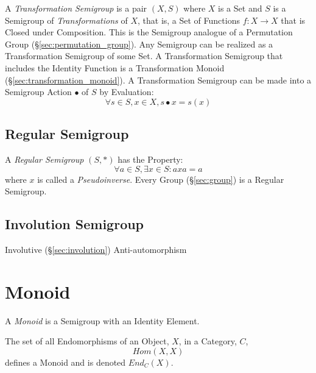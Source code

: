 A \emph{Transformation Semigroup} is a pair $(X,S)$ where $X$ is a Set
and $S$ is a Semigroup of \emph{Transformations} of $X$, that is, a
Set of Functions $f : X \rightarrow X$ that is Closed under
Composition. This is the Semigroup analogue of a Permutation Group
(\S\ref{sec:permutation_group}). Any Semigroup can be realized as a
Transformation Semigroup of some Set. A Transformation Semigroup that
includes the Identity Function is a Transformation Monoid
(\S\ref{sec:transformation_monoid}). A Transformation Semigroup can be
made into a Semigroup Action $\bullet$ of $S$ by Evaluation:
\[
  \forall s \in S, x \in X, s \bullet x = s(x)
\]



\subsection{Regular Semigroup}\label{sec:regular_semigroup}

A \emph{Regular Semigroup} $(S,*)$ has the Property:
\[
  \forall a \in S, \exists x \in S : axa = a
\]
where $x$ is called a \emph{Pseudoinverse}. Every Group
(\S\ref{sec:group}) is a Regular Semigroup.



\subsection{Involution Semigroup}\label{sec:involution_semigroup}

Involutive (\S\ref{sec:involution}) Anti-automorphism



\section{Monoid}\label{sec:monoid}

A \emph{Monoid} is a Semigroup with an Identity Element.

The set of all Endomorphisms of an Object, $X$, in a Category, $C$,
\[
    Hom(X,X)
\]
defines a Monoid and is denoted $End_C(X)$.

